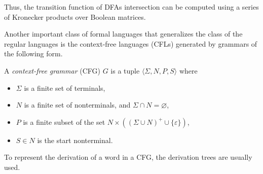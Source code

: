 Thus, the transition function of DFAs intersection can be computed using a series of Kronecker products over Boolean matrices.

Another important class of formal languages that generalizes the class of the regular languages is the context-free languages (CFLs) generated by grammars of the following form.

\begin{definition}
	A \textit{context-free grammar} (CFG) $G$ is a tuple $\langle \Sigma, N, P, S \rangle$ where 
	\begin{itemize}
		\item $\Sigma$ is a finite set of terminals, 
		\item $N$ is a finite set of nonterminals, and $\Sigma \cap N=\varnothing$, 
		\item $P$ is a finite subset of the set $N \times ( (\Sigma \cup N)^+ \cup \{\varepsilon\} )$,  
		\item $S \in N$ is the start nonterminal. 
	\end{itemize}
\end{definition}

To represent the derivation of a word in a CFG, the derivation trees are usually used.

